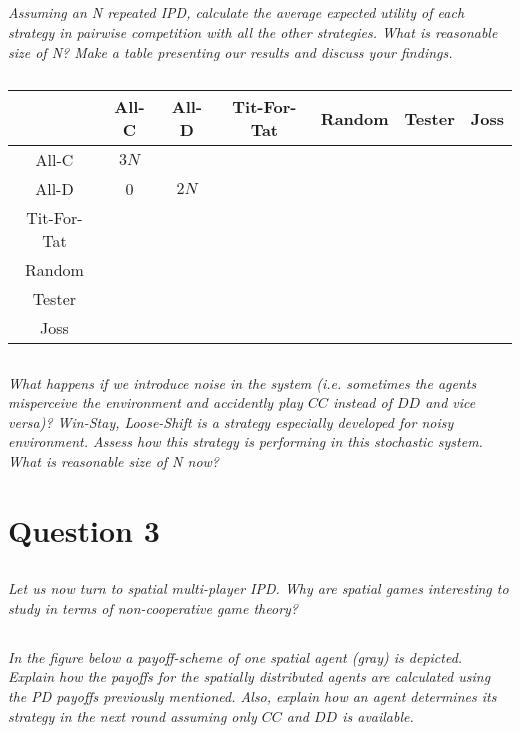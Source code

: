 \documentclass{article}
\begin{document}
\subsection{ }
\textit{Assuming an N repeated IPD, calculate the average expected utility of each strategy in pairwise
competition with all the other strategies. What is reasonable size of N? Make a table presenting
our results and discuss your findings.}

\begin{table}[h!]
\centering
 \begin{tabular}{|| c || c | c | c | c | c | c ||} 
 \hline
  & All-C & All-D & Tit-For-Tat & Random & Tester & Joss \\ [2ex] 
 \hline\hline
 All-C & \(3N\) &  &  & & & \\ 
 \hline
 All-D &  0 & \(2N\) &  & & & \\
 \hline
 Tit-For-Tat &  &  &  & & & \\
 \hline
 Random &  &  &  & & & \\
 \hline
 Tester &  &  &  & & & \\
 \hline
 Joss  & & & & & &  \\[1ex] 
 \hline
 \end{tabular}
 \caption{ }
 \end{table}

\subsection{ }
\textit{What happens if we introduce noise in the system (i.e. sometimes the agents misperceive the environment and accidently play \(CC\) instead of \(DD\) and vice versa)? Win-Stay, Loose-Shift is a strategy especially developed for noisy environment. Assess how this strategy is performing in this stochastic system. What is reasonable size of N now?}


\section{Question 3}
\subsection{ }
\textit{Let us now turn to spatial multi-player IPD. Why are spatial games interesting to study in terms
of non-cooperative game theory?}

\subsection{ }
\textit{In the figure below a payoff-scheme of one spatial agent (gray) is depicted. Explain how the
payoffs for the spatially distributed agents are calculated using the PD payoffs previously
mentioned. Also, explain how an agent determines its strategy in the next round assuming only \(CC\)
and \(DD\) is available.}
\end{document}
